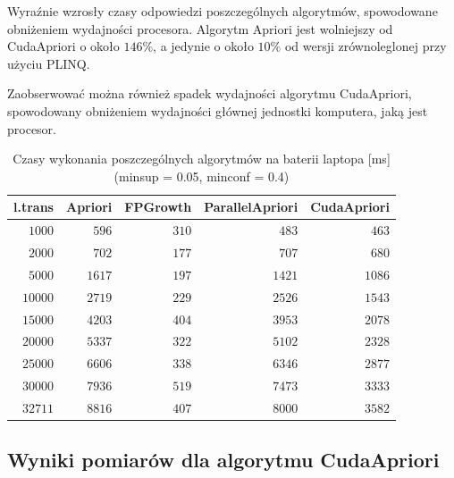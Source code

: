 Wyraźnie wzrosły czasy odpowiedzi poszczególnych algorytmów, spowodowane obniżeniem wydajności procesora. Algorytm Apriori jest wolniejszy od CudaApriori o około $146\%$, a jedynie o około $10\%$ od wersji zrównoleglonej przy użyciu PLINQ.

Zaobserwować można również spadek wydajności algorytmu CudaApriori, spowodowany obniżeniem wydajności głównej jednostki komputera, jaką jest procesor.

\begin{table}
	\centering
	\begin{tabular}{r|r|r|r|r}
	\textbf{l.trans} & \textbf{Apriori} & \textbf{FPGrowth} & \textbf{ParallelApriori} & \textbf{CudaApriori}  \\ \hline
	$1000$ & $596$ & $310$ & $483$ & $463$ \\
	$2000$ & $702$ & $177$ & $707$ & $680$ \\
	$5000$ & $1617$ & $197$ & $1421$ & $1086$ \\
	$10000$ & $2719$ & $229$ & $2526$ & $1543$ \\
	$15000$ & $4203$ & $404$ & $3953$ & $2078$ \\
	$20000$ & $5337$ & $322$ & $5102$ & $2328$ \\
	$25000$ & $6606$ & $338$ & $6346$ & $2877$ \\
	$30000$ & $7936$ & $519$ & $7473$ & $3333$ \\
	$32711$ & $8816$ & $407$ & $8000$ & $3582$ \\
	\end{tabular}
	\caption{Czasy wykonania poszczególnych algorytmów na baterii laptopa [ms] (minsup = 0.05, minconf = 0.4)\label{tab:005_04_bat}}
\end{table}


\subsection{Wyniki pomiarów dla algorytmu CudaApriori}

